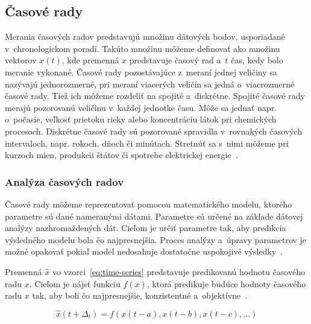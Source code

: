 \documentclass[a4paper,twoside,slovak,12pt,appendix]{article}
\begin{document}

\subsection{Časové rady}
Merania časových radov predstavujú množinu dátových bodov, usporiadané
v~chronologickom poradí. Takúto množinu môžeme definovať ako množinu vektorov
$x(t)$, kde premenná $x$ predstavuje časový rad a~$t$ čas, kedy bolo meranie
vykonané. Časové rady pozostávajúce z~meraní jednej veličiny sa nazývajú
jednorozmerné, pri meraní viacerých veličín sa jedná o~viacrozmerné časové rady.
Tiež ich môžeme rozdeliť na spojité a~diskrétne. Spojité časové rady merajú
pozorovanú veličinu v~každej jednotke času. Môže sa jednať napr. o~počasie,
veľkosť prietoku rieky alebo koncentráciu látok pri chemických procesoch.
Diskrétne časové rady sú pozorované spravidla v~rovnakých časových intervaloch,
napr. rokoch, dňoch či minútach. Stretnúť sa s~nimi môžeme pri kurzoch mien,
produkcii štátov či spotrebe elektrickej energie~\cite{Agrawal2013}.


\subsubsection{Analýza časových radov}
Časové rady môžeme reprezentovať pomocou matematického modelu, ktorého parametre
sú dané nameranými dátami. Parametre sú určené na základe dátovej analýzy
nazhromaždených dát. Cieľom je určiť parametre tak, aby predikcia výsledného
modelu bola čo najpresnejšia. Proces analýzy a~úpravy parametrov je možné
opakovať pokiaľ model nedosahuje dostatočne uspokojivé
výsledky~\cite{Agrawal2013}.

Premenná $\hat{x}$ vo vzorci~\ref{eq:time-series} predstavuje predikovanú
hodnotu časového radu $x$. Cieľom je nájsť funkciu $f(x)$, ktorá predikuje
budúce hodnoty časového radu $x$ tak, aby boli čo najpresnejšie, konzistentné
a~objektívne~\cite{Sapankevych2009}.

\begin{equation}
  \hat{x}(t+\Delta_t) = f(x(t-a), x(t-b), x(t-c), ...)
  \label{eq:time-series}
\end{equation}
\end{document}
